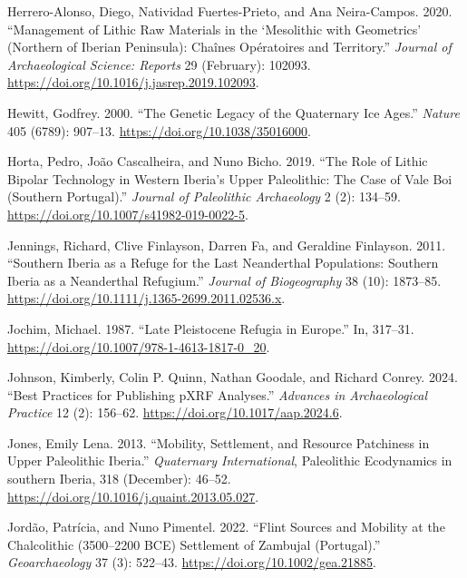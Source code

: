 \documentclass[
  a4paper,
  DIV=11,
  numbers=noendperiod]{scrreprt}
\newlength{\cslhangindent}
\newenvironment{CSLReferences}[2] %
 {\begin{list}{}{%
  \setlength{\itemindent}{0pt}
  \setlength{\leftmargin}{0pt}
  \setlength{\parsep}{0pt}
  \ifodd #1
   \setlength{\leftmargin}{\cslhangindent}
   \setlength{\itemindent}{-1\cslhangindent}
  \fi
  \setlength{\itemsep}{#2\baselineskip}}}
 {\end{list}}
\begin{document}
\begin{CSLReferences}{1}{0}
Herrero-Alonso, Diego, Natividad Fuertes-Prieto, and Ana Neira-Campos.
2020. {``Management of Lithic Raw Materials in the {`{Mesolithic} with
Geometrics'} ({Northern} of {Iberian Peninsula}): Cha{î}nes
Op{é}ratoires and Territory.''} \emph{Journal of Archaeological Science:
Reports} 29 (February): 102093.
\url{https://doi.org/10.1016/j.jasrep.2019.102093}.

Hewitt, Godfrey. 2000. {``The Genetic Legacy of the {Quaternary} Ice
Ages.''} \emph{Nature} 405 (6789): 907--13.
\url{https://doi.org/10.1038/35016000}.

Horta, Pedro, João Cascalheira, and Nuno Bicho. 2019. {``The {Role} of
{Lithic Bipolar Technology} in {Western Iberia}'s {Upper Paleolithic}:
The {Case} of {Vale Boi} ({Southern Portugal}).''} \emph{Journal of
Paleolithic Archaeology} 2 (2): 134--59.
\url{https://doi.org/10.1007/s41982-019-0022-5}.

Jennings, Richard, Clive Finlayson, Darren Fa, and Geraldine Finlayson.
2011. {``Southern {Iberia} as a Refuge for the Last {Neanderthal}
Populations: {Southern Iberia} as a {Neanderthal} Refugium.''}
\emph{Journal of Biogeography} 38 (10): 1873--85.
\url{https://doi.org/10.1111/j.1365-2699.2011.02536.x}.

Jochim, Michael. 1987. {``Late {Pleistocene Refugia} in {Europe}.''} In,
317--31. \url{https://doi.org/10.1007/978-1-4613-1817-0_20}.

Johnson, Kimberly, Colin P. Quinn, Nathan Goodale, and Richard Conrey.
2024. {``Best {Practices} for {Publishing pXRF Analyses}.''}
\emph{Advances in Archaeological Practice} 12 (2): 156--62.
\url{https://doi.org/10.1017/aap.2024.6}.

Jones, Emily Lena. 2013. {``Mobility, Settlement, and Resource
Patchiness in {Upper Paleolithic Iberia}.''} \emph{Quaternary
International}, Paleolithic {Ecodynamics} in southern {Iberia}, 318
(December): 46--52. \url{https://doi.org/10.1016/j.quaint.2013.05.027}.

Jordão, Patrícia, and Nuno Pimentel. 2022. {``Flint Sources and Mobility
at the {Chalcolithic} (3500--2200 {BCE}) Settlement of {Zambujal}
({Portugal}).''} \emph{Geoarchaeology} 37 (3): 522--43.
\url{https://doi.org/10.1002/gea.21885}.


\end{CSLReferences}
\end{document}
